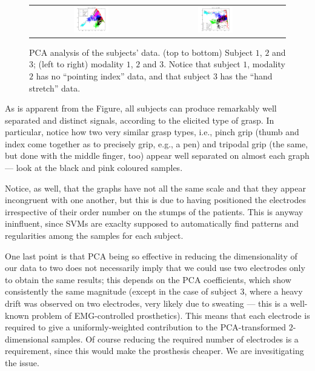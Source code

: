 \begin{figure}[!ht]
\begin{tabular}{ccc}
    \includegraphics[width=0.3\textwidth]{figs/data32} &
    \includegraphics[width=0.3\textwidth]{figs/data33} \\
  \end{tabular}
  \caption{ PCA analysis of the subjects' data. (top to bottom)
    Subject $1$, $2$ and $3$; (left to right) modality $1$, $2$ and
    $3$. Notice that subject $1$, modality $2$ has no ``pointing
    index'' data, and that subject $3$ has the ``hand stretch'' data.}
  \label{fig:PCA}
\end{figure}

As is apparent from the Figure, all subjects can produce remarkably
well separated and distinct signals, according to the elicited type of
grasp. In particular, notice how two very similar grasp types, i.e.,
pinch grip (thumb and index come together as to precisely grip, e.g.,
a pen) and tripodal grip (the same, but done with the middle finger,
too) appear well separated on almost each graph --- look at the black
and pink coloured samples.

Notice, as well, that the graphs have not all the same scale and that
they appear incongruent with one another, but this is due to
having positioned the electrodes irrespective of their order number on
the stumps of the patients. This is anyway ininfluent, since SVMs
are exaclty supposed to automatically find patterns and regularities
among the samples for each subject.

One last point is that PCA being so effective in reducing the
dimensionality of our data to two does not necessarily imply that we
could use two electrodes only to obtain the same results; this depends
on the PCA coefficients, which show consistently the same magnitude
(except in the case of subject $3$, where a heavy drift was observed
on two electrodes, very likely due to sweating --- this is a well-known
problem of EMG-controlled prosthetics). This means that each electrode
is required to give a uniformly-weighted contribution to the
PCA-transformed $2$-dimensional samples. Of course reducing the
required number of electrodes is a requirement, since this would make
the prosthesis cheaper. We are invesitigating the issue.
